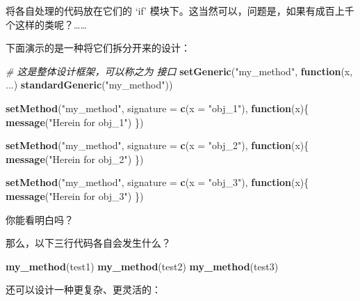 \documentclass[
]{article}
\newenvironment{Shaded}{\begin{snugshade}}{\end{snugshade}}
\newcommand{\CommentTok}[1]{\textcolor[rgb]{0.56,0.35,0.01}{\textit{#1}}}
\newcommand{\ControlFlowTok}[1]{\textcolor[rgb]{0.13,0.29,0.53}{\textbf{#1}}}
\newcommand{\DataTypeTok}[1]{\textcolor[rgb]{0.13,0.29,0.53}{#1}}
\newcommand{\KeywordTok}[1]{\textcolor[rgb]{0.13,0.29,0.53}{\textbf{#1}}}
\newcommand{\NormalTok}[1]{#1}
\newcommand{\StringTok}[1]{\textcolor[rgb]{0.31,0.60,0.02}{#1}}
\begin{document}
将各自处理的代码放在它们的 `if' 模块下。这当然可以，问题是，如果有成百上千个这样的类呢？\ldots\ldots{}

下面演示的是一种将它们拆分开来的设计：

\begin{Shaded}
\begin{Highlighting}[]
\CommentTok{\# 这是整体设计框架，可以称之为 \textquotesingle{}接口\textquotesingle{}}
\KeywordTok{setGeneric}\NormalTok{(}\StringTok{"my\_method"}\NormalTok{, }\ControlFlowTok{function}\NormalTok{(x, ...) }\KeywordTok{standardGeneric}\NormalTok{(}\StringTok{"my\_method"}\NormalTok{))}

\KeywordTok{setMethod}\NormalTok{(}\StringTok{"my\_method"}\NormalTok{, }\DataTypeTok{signature =} \KeywordTok{c}\NormalTok{(}\DataTypeTok{x =} \StringTok{"obj\_1"}\NormalTok{),}
  \ControlFlowTok{function}\NormalTok{(x)\{}
    \KeywordTok{message}\NormalTok{(}\StringTok{"Herein for obj\_1"}\NormalTok{)}
\NormalTok{  \})}

\KeywordTok{setMethod}\NormalTok{(}\StringTok{"my\_method"}\NormalTok{, }\DataTypeTok{signature =} \KeywordTok{c}\NormalTok{(}\DataTypeTok{x =} \StringTok{"obj\_2"}\NormalTok{),}
  \ControlFlowTok{function}\NormalTok{(x)\{}
    \KeywordTok{message}\NormalTok{(}\StringTok{"Herein for obj\_2"}\NormalTok{)}
\NormalTok{  \})}

\KeywordTok{setMethod}\NormalTok{(}\StringTok{"my\_method"}\NormalTok{, }\DataTypeTok{signature =} \KeywordTok{c}\NormalTok{(}\DataTypeTok{x =} \StringTok{"obj\_3"}\NormalTok{),}
  \ControlFlowTok{function}\NormalTok{(x)\{}
    \KeywordTok{message}\NormalTok{(}\StringTok{"Herein for obj\_3"}\NormalTok{)}
\NormalTok{  \})}
\end{Highlighting}
\end{Shaded}

你能看明白吗？

那么，以下三行代码各自会发生什么？

\begin{Shaded}
\begin{Highlighting}[]
\KeywordTok{my\_method}\NormalTok{(test1)}
\KeywordTok{my\_method}\NormalTok{(test2)}
\KeywordTok{my\_method}\NormalTok{(test3)}
\end{Highlighting}
\end{Shaded}

还可以设计一种更复杂、更灵活的：
\end{document}
